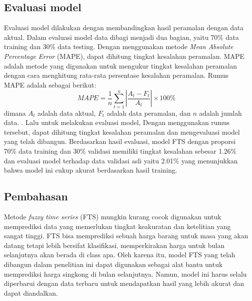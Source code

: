 \documentclass[conference]{IEEEtran}
\begin{document}
\subsection{Evaluasi model}
Evaluasi model dilakukan dengan membandingkan hasil peramalan dengan data aktual. Dalam evaluasi model data dibagi menjadi dua bagian, yaitu 70\% data training dan 30\% data testing. Dengan menggunakan metode \textit{Mean Absolute Percentage Error} (MAPE), dapat dihitung tingkat kesalahan peramalan. MAPE adalah metode yang digunakan untuk mengukur tingkat kesalahan peramalan dengan cara menghitung rata-rata persentase kesalahan peramalan. Rumus MAPE adalah sebagai berikut:
\begin{equation}
    MAPE = \frac{1}{n} \sum_{t=1}^{n} \left| \frac{A_t - F_t}{A_t} \right| \times 100\%
\end{equation}
dimana $A_t$ adalah data aktual, $F_t$ adalah data peramalan, dan $n$ adalah jumlah data. . Lalu untuk melakukan evaluasi model,  
Dengan menggunakan rumus tersebut, dapat dihitung tingkat kesalahan peramalan dan mengevaluasi model yang telah dibangun. Berdasarkan hasil evaluasi, model FTS dengan proporsi 70\% data training dan 30\% validasi memiliki tingkat kesalahan sebesar 1.26\% dan evaluasi model terhadap data validasi asli yaitu 2.01\% yang menunjukkan bahwa model ini cukup akurat berdasarkan hasil training.

\subsection{Pembahasan}
Metode \textit{fuzzy time series} (FTS) mungkin kurang cocok digunakan untuk memprediksi data yang memerlukan tingkat keakuratan dan ketelitian yang sangat tinggi. FTS bisa memprediksi sebuah harga barang untuk masa yang akan datang tetapi lebih bersifat klasifikasi, memperkirakan harga untuk bulan selanjutnya akan berada di class apa. Oleh karena itu, model FTS yang telah dibangun dalam penelitian ini dapat digunakan sebagai alat bantu untuk memprediksi harga singkong di bulan selanjutnya. Namun, model ini harus selalu diperbarui dengan data terbaru untuk mendapatkan hasil yang lebih akurat dan dapat diandalkan.
\end{document}
